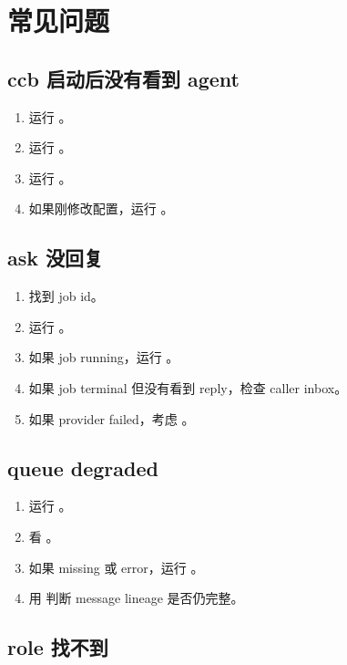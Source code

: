 \chapter{常见问题}

\section{ccb 启动后没有看到 agent}

\begin{enumerate}
  \item 运行 。
  \item 运行 。
  \item 运行 。
  \item 如果刚修改配置，运行 。
\end{enumerate}

\section{ask 没回复}

\begin{enumerate}
  \item 找到 job id。
  \item 运行 。
  \item 如果 job running，运行 。
  \item 如果 job terminal 但没有看到 reply，检查 caller inbox。
  \item 如果 provider failed，考虑 。
\end{enumerate}

\section{queue degraded}

\begin{enumerate}
  \item 运行 。
  \item 看 。
  \item 如果 missing 或 error，运行 。
  \item 用  判断 message lineage 是否仍完整。
\end{enumerate}

\section{role 找不到}

